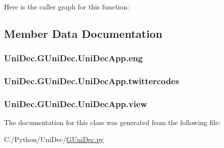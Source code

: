 Here is the caller graph for this function\+:




\subsection{Member Data Documentation}
\hypertarget{class_uni_dec_1_1_g_uni_dec_1_1_uni_dec_app_a1f220c87c58eab43b0d4311165e26028}{}
\subsubsection[{eng}]{\setlength{\rightskip}{0pt plus 5cm}Uni\+Dec.\+G\+Uni\+Dec.\+Uni\+Dec\+App.\+eng}\label{class_uni_dec_1_1_g_uni_dec_1_1_uni_dec_app_a1f220c87c58eab43b0d4311165e26028}
\hypertarget{class_uni_dec_1_1_g_uni_dec_1_1_uni_dec_app_a0a18efbbf3628fb0ddec272376aca130}{}
\subsubsection[{twittercodes}]{\setlength{\rightskip}{0pt plus 5cm}Uni\+Dec.\+G\+Uni\+Dec.\+Uni\+Dec\+App.\+twittercodes}\label{class_uni_dec_1_1_g_uni_dec_1_1_uni_dec_app_a0a18efbbf3628fb0ddec272376aca130}
\hypertarget{class_uni_dec_1_1_g_uni_dec_1_1_uni_dec_app_afcd9db1e30556b34ac144e339e799df3}{}
\subsubsection[{view}]{\setlength{\rightskip}{0pt plus 5cm}Uni\+Dec.\+G\+Uni\+Dec.\+Uni\+Dec\+App.\+view}\label{class_uni_dec_1_1_g_uni_dec_1_1_uni_dec_app_afcd9db1e30556b34ac144e339e799df3}


The documentation for this class was generated from the following file\+:\begin{DoxyCompactItemize}
\item 
C\+:/\+Python/\+Uni\+Dec/\hyperlink{_g_uni_dec_8py}{G\+Uni\+Dec.\+py}\end{DoxyCompactItemize}
